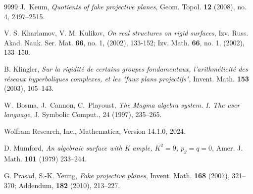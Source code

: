 \documentclass[11pt,reqno]{amsart}
\theoremstyle{definition}
\numberwithin{equation}{section}
\begin{document}
\begin{thebibliography}{9999}
 J.~Keum, {\em Quotients of fake projective planes}, 
Geom. Topol. {\bf 12} (2008), no. 4, 2497--2515.

 V. S.  Kharlamov, V. M. Kulikov, {\em On real structures on rigid surfaces}, Izv. Russ. Akad. Nauk. Ser. Mat. {\bf 66}, no. 1, (2002),  133-152; Izv. Math. {\bf 66}, no. 1, (2002), 133--150.

 B. Klingler, {\em Sur la rigidit\'e de certains groupes fondamentaux, l'arithm\'eticit\'e des r\'eseaux hyperboliques complexes, et les "faux plans projectifs"}, Invent. Math. {\bf 153} (2003), 105--143.

W.~Bosma, J.~Cannon, C.~Playoust, {\em The Magma algebra system. I. The user language}, J. Symbolic Comput., 24 (1997), 235--265.

Wolfram Research, Inc., Mathematica, Version 14.1.0, 2024.

 D. Mumford, {\em An algebraic surface with K ample, $K^2=9$, $p_g=q=0$}, Amer. J. Math. {\bf 101} (1979) 233--244.

 G. Prasad, S.-K. Yeung, {\em Fake projective planes}, Invent. Math. {\bf 168} (2007),
321--370; Addendum, {\bf 182 } (2010), 213--227.


\end{thebibliography}
\end{document}
